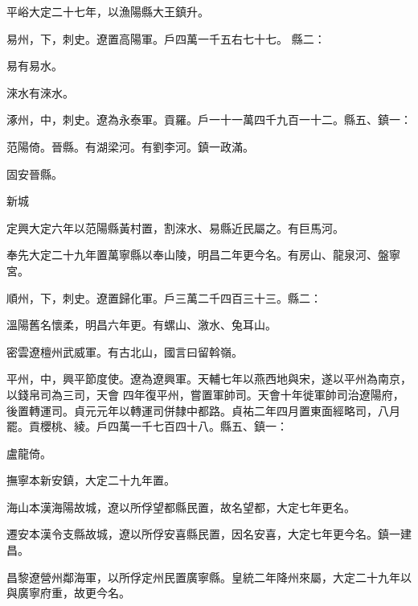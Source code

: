 \begin{pinyinscope}
 平峪大定二十七年，以漁陽縣大王鎮升。



 易州，下，刺史。遼置高陽軍。戶四萬一千五右七十七。
 縣二：



 易有易水。



 淶水有淶水。



 涿州，中，刺史。遼為永泰軍。貢羅。戶一十一萬四千九百一十二。縣五、鎮一：



 范陽倚。晉縣。有湖梁河。有劉李河。鎮一政滿。



 固安晉縣。



 新城



 定興大定六年以范陽縣黃村置，割淶水、易縣近民屬之。有巨馬河。



 奉先大定二十九年置萬寧縣以奉山陵，明昌二年更今名。有房山、龍泉河、盤寧宮。



 順州，下，刺史。遼置歸化軍。戶三萬二千四百三十三。縣二：



 溫陽舊名懷柔，明昌六年更。有螺山、漵水、兔耳山。



 密雲遼檀州武威軍。有古北山，國言曰留斡嶺。



 平州，中，興平節度使。遼為遼興軍。天輔七年以燕西地與宋，遂以平州為南京，以錢帛司為三司，天會
 四年復平州，嘗置軍帥司。天會十年徙軍帥司治遼陽府，後置轉運司。貞元元年以轉運司併隸中都路。貞祐二年四月置東面經略司，八月罷。貢櫻桃、綾。戶四萬一千七百四十八。縣五、鎮一：



 盧龍倚。



 撫寧本新安鎮，大定二十九年置。



 海山本漢海陽故城，遼以所俘望都縣民置，故名望都，大定七年更名。



 遷安本漢令支縣故城，遼以所俘安喜縣民置，因名安喜，大定七年更今名。鎮一建昌。



 昌黎遼營州鄰海軍，以所俘定州民置廣寧縣。皇統二年降州來屬，大定二十九年以與廣寧府重，故更今名。




\end{pinyinscope}
